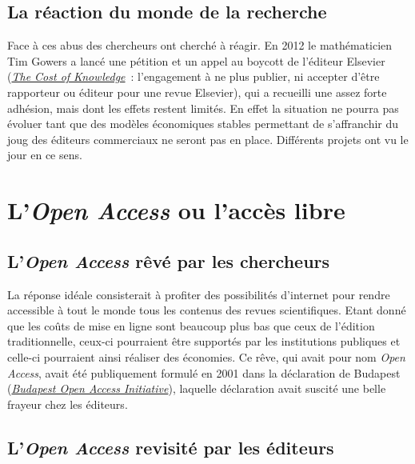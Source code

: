 \subsection{La r{\'e}action du monde de la recherche}

Face {\`a} ces abus des chercheurs ont cherch{\'e} {\`a} r{\'e}agir. En 2012 le math{\'e}maticien Tim Gowers a lanc{\'e} une p{\'e}tition et un appel au boycott de l'{\'e}diteur
Elsevier (\href{http://www.thecostofknowledge.com/}{\emph{The Cost of Knowledge}}~: l'engagement {\`a}
ne plus publier, ni accepter d'{\^e}tre rapporteur ou {\'e}diteur pour une revue Elsevier), qui a
recueilli une assez forte adh{\'e}sion, mais dont les effets restent limit{\'e}s. En effet la situation ne pourra pas {\'e}voluer tant que des mod{\`e}les
{\'e}conomiques stables permettant de s'affranchir du joug des {\'e}diteurs commerciaux ne seront pas en place. Diff{\'e}rents projets ont vu le jour en ce sens.

\section{L'\emph{Open Access} ou l'acc{\`e}s libre}

\subsection{L'\emph{Open Access} r{\^e}v{\'e} par les chercheurs}

La r{\'e}ponse id{\'e}ale consisterait {\`a} profiter des possibilit{\'e}s d'internet pour rendre accessible {\`a} tout le monde tous les  contenus des revues scientifiques.
Etant donn{\'e} que les co{\^u}ts de mise en ligne sont beaucoup plus bas que ceux de l'{\'e}dition traditionnelle, ceux-ci pourraient {\^e}tre support{\'e}s par les
institutions publiques et celle-ci pourraient ainsi r{\'e}aliser des {\'e}conomies. Ce r{\^e}ve, qui avait pour nom \emph{Open Access}, avait {\'e}t{\'e} publiquement formul{\'e}
en 2001 dans la d{\'e}claration de Budapest (\href{http://www.budapestopenaccessinitiative.org/}{\emph{Budapest Open Access Initiative}}),
laquelle d{\'e}claration avait
suscit{\'e} une belle frayeur chez les {\'e}diteurs.

\subsection{L'\emph{Open Access} revisit{\'e} par les {\'e}diteurs}

